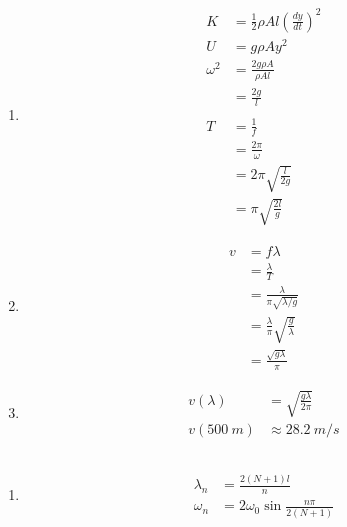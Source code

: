 \documentclass{article}
\begin{document}
\begin{enumerate}
  \item

        \begin{align*}
          K        & = \frac{1}{2} \rho A l \left( \frac{d y}{d t} \right)^2 \\
          U        & = g \rho A y^2                                          \\
          \omega^2 & = \frac{2 g \rho A}{\rho A l}                           \\
                   & = \frac{2 g}{l}                                         \\ \\
          T        & = \frac{1}{f}                                           \\
                   & = \frac{2 \pi}{\omega}                                  \\
                   & = 2 \pi \sqrt{\frac{l}{2 g}}                            \\
                   & = \pi \sqrt{\frac{2 l}{g}}
        \end{align*}

  \item

        \begin{align*}
          v & = f \lambda                                    \\
            & = \frac{\lambda}{T}                            \\
            & = \frac{\lambda}{\pi \sqrt{\lambda / g}}       \\
            & = \frac{\lambda}{\pi} \sqrt{\frac{g}{\lambda}} \\
            & = \frac{\sqrt{g \lambda}}{\pi}
        \end{align*}

  \item

        \begin{align*}
          v(\lambda)      & = \sqrt{\frac{g \lambda}{2 \pi}} \\
          v(\qty{500}{m}) & \approx \qty{28.2}{m/s}
        \end{align*}
\end{enumerate}

\subsection{}

\begin{enumerate}
  \item

        \begin{align*}
          \lambda_n & = \frac{2 (N + 1) l}{n}                   \\
          \omega_n  & = 2 \omega_0 \sin \frac{n \pi}{2 (N + 1)}
        \end{align*}
\end{enumerate}
\end{document}
